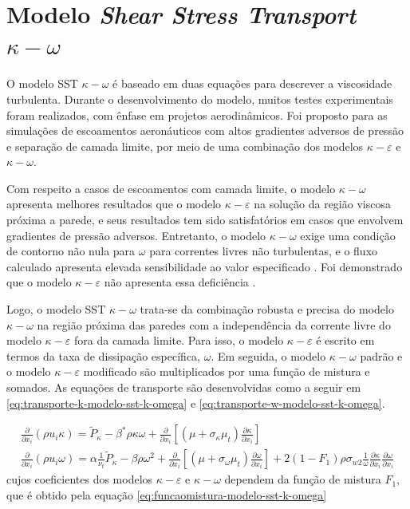 \section{Modelo \textit{Shear Stress Transport} \texorpdfstring{\(\kappa-\omega\)}{k-w}}

O modelo SST \(\kappa-\omega\) \cite{Menter1994TwoequationET,Menter2003,Menter2009} é baseado em duas equações para descrever a viscosidade turbulenta. Durante o desenvolvimento do modelo, muitos testes experimentais foram realizados, com ênfase em projetos aerodinâmicos. Foi proposto para as simulações de escoamentos aeronáuticos com altos gradientes adversos de pressão e separação de camada limite, por meio de uma combinação dos modelos \(\kappa-\varepsilon\) e \(\kappa-\omega\).

Com respeito a casos de escoamentos com camada limite, o modelo \(\kappa-\omega\) apresenta melhores resultados que o modelo \(\kappa-\varepsilon\) na solução da região viscosa próxima a parede, e seus resultados tem sido satisfatórios em casos que envolvem gradientes de pressão adversos. Entretanto, o modelo \(\kappa-\omega\) exige uma condição de contorno não nula para \(\omega\) para correntes livres não turbulentas, e o fluxo calculado apresenta elevada sensibilidade ao valor especificado \cite{Menter1994TwoequationET}. Foi demonstrado que o modelo \(\kappa-\varepsilon\) não apresenta essa deficiência \cite{Cazalbou1994}.

Logo, o modelo SST \(\kappa-\omega\) trata-se da combinação robusta e precisa do modelo \(\kappa-\omega\) na região próxima das paredes com a independência da corrente livre do modelo \(\kappa-\varepsilon\) fora da camada limite. Para isso, o modelo \(\kappa-\varepsilon\) é escrito em termos da taxa de dissipação específica, \(\omega\). Em seguida, o modelo \(\kappa-\omega\) padrão e o modelo \(\kappa-\varepsilon\) modificado são multiplicados por uma função de mistura e somados. As equações de transporte são desenvolvidas como a seguir em \ref{eq:transporte-k-modelo-sst-k-omega} e \ref{eq:transporte-w-modelo-sst-k-omega}.

\begin{gather}
    \frac{\partial}{\partial x_i}(\rho u_i \kappa) = \tilde{P}_\kappa - \beta^{*}\rho\kappa\omega + \frac{\partial}{\partial x_i}\left[(\mu + \sigma_{\kappa}\mu_t)\frac{\partial \kappa}{\partial x_i}\right]
    \label{eq:transporte-k-modelo-sst-k-omega}
    \\
   	\frac{\partial}{\partial x_i}(\rho u_i \omega)  = \alpha\frac{1}{\nu_t}\tilde{P}_\kappa - \beta\rho\omega^{2} + \frac{\partial}{\partial x_i}\left[(\mu + \sigma_{\omega}\mu_t)\frac{\partial \omega}{\partial x_i}\right] + 2(1 - F_1)\rho\sigma_{w2}\frac{1}{\omega}\frac{\partial\kappa}{\partial x_i}\frac{\partial \omega}{\partial x_i}
    \label{eq:transporte-w-modelo-sst-k-omega}
\end{gather}
%
cujos coeficientes dos modelos \(\kappa-\varepsilon\) e \(\kappa-\omega\) dependem da função de mistura \(F_1\), que é obtido pela equação \ref{eq:funcaomistura-modelo-sst-k-omega}

